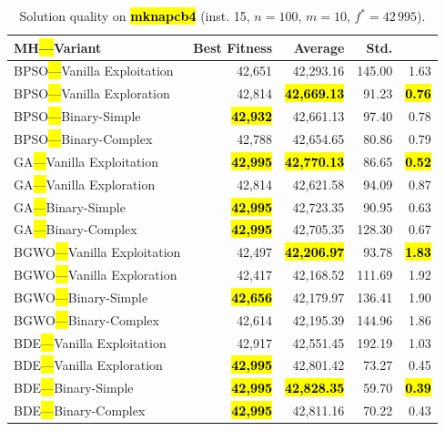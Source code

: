\documentclass[mathematics,article,accept,moreauthors]{Definitions/mdpi}
\begin{document}
\vspace{-9pt}

\begin{table}[H]
  \small
  \caption{Solution quality on \textbf{\hl{mknapcb4}} (inst. 15, $n=100$, $m=10$, $f^*=42\,995$).}
  \label{tab:calidad_mknapcb4_15}
  \begin{tabularx}{\textwidth}{lRRRR}
    \toprule
    \textbf{MH\hl{---}Variant} &
    \textbf{Best Fitness} &
    \textbf{Average} &
    \textbf{Std.} &
    \textbf{} \\
    \midrule
    BPSO\hl{---}Vanilla Exploitation &          42,651 &         42,293.16 & 145.00 &         1.63 \\
    BPSO\hl{---}Vanilla Exploration  &          42,814 & \textbf{\hl{42,669.13}} &  91.23 & \textbf{\hl{0.76}} \\
    BPSO\hl{---}Binary-Simple        & \textbf{\hl{42,932}} &         42,661.13 &  97.40 &         0.78 \\
    BPSO\hl{---}Binary-Complex       &          42,788 &         42,654.65 &  80.86 &         0.79 \\
    \midrule
    GA\hl{---}Vanilla Exploitation   & \textbf{\hl{42,995}} & \textbf{\hl{42,770.13}} &  86.65 & \textbf{\hl{0.52}} \\
    GA\hl{---}Vanilla Exploration    &          42,814 &         42,621.58 &  94.09 &         0.87 \\
    GA\hl{---}Binary-Simple          & \textbf{\hl{42,995}} &         42,723.35 &  90.95 &         0.63 \\
    GA\hl{---}Binary-Complex         & \textbf{\hl{42,995}} &         42,705.35 & 128.30 &         0.67 \\
    \midrule
    BGWO\hl{---}Vanilla Exploitation &          42,497 & \textbf{\hl{42,206.97}} &  93.78 & \textbf{\hl{1.83}} \\
    BGWO\hl{---}Vanilla Exploration  &          42,417 &         42,168.52 & 111.69 &         1.92 \\
    BGWO\hl{---}Binary-Simple        & \textbf{\hl{42,656}} &         42,179.97 & 136.41 &         1.90 \\
    BGWO\hl{---}Binary-Complex       &          42,614 &         42,195.39 & 144.96 &         1.86 \\
    \midrule
    BDE\hl{---}Vanilla Exploitation  &          42,917 &         42,551.45 & 192.19 &         1.03 \\
    BDE\hl{---}Vanilla Exploration   & \textbf{\hl{42,995}} &         42,801.42 &  73.27 &         0.45 \\
    BDE\hl{---}Binary-Simple         & \textbf{\hl{42,995}} & \textbf{\hl{42,828.35}} &  59.70 & \textbf{\hl{0.39}} \\
    BDE\hl{---}Binary-Complex        & \textbf{\hl{42,995}} &         42,811.16 &  70.22 &         0.43 \\
    \bottomrule
  \end{tabularx}
\end{table}
\end{document}
